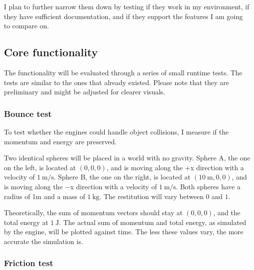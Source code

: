 I plan to further narrow them down by testing if they work in my environment, 
if they have sufficient documentation, 
and if they support the features I am going to compare on.

\subsection{Core functionality}

The functionality will be evaluated through a series of small runtime tests.
The tests are similar to the ones that already existed\cite{seugling2006evaluation}.
Please note that they are preliminary and might be adjusted for clearer visuals.

\subsubsection{Bounce test}

To test whether the engines could handle object collisions, I measure if the momentum and energy are preserved.

Two identical spheres will be placed in a world with no gravity. 
Sphere A, the one on the left, is located at $(0, 0, 0)$, and is moving along the $+$x direction with a velocity of $\SI{1}{\m\per\s}$.
Sphere B, the one on the right, is located at $(\SI{10}{\m}, 0, 0)$, and is moving along the $-$x direction with a velocity of $\SI{1}{\m\per\s}$.
Both spheres have a radius of 1m and a mass of $\SI{1}{\kg}$. The restitution will vary between $0$ and $1$.

\begin{center}
  \end{center}

Theoretically, the sum of momentum vectors should stay at $(0, 0, 0)$, and the total energy at $\SI{1}{\J}$.
The actual sum of momentum and total energy, as simulated by the engine, will be plotted against time.
The less these values vary, the more accurate the simulation is.

\subsubsection{Friction test}

